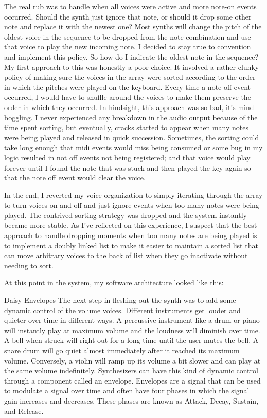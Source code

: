 \documentclass[acmlarge,screen]{acmart}
\begin{document}
The real rub was to handle when all voices were active and more note-on events occurred. Should the synth just ignore that note, or should it drop some other note and replace it with the newest one? Most synths will change the pitch of the oldest voice in the sequence to be dropped from the note combination and use that voice to play the new incoming note. I decided to stay true to convention and implement this policy. So how do I indicate the oldest note in the sequence? My first approach to this was honestly a poor choice. It involved a rather clunky policy of making sure the voices in the array were sorted according to the order in which the pitches were played on the keyboard. Every time a note-off event occurred, I would have to shuffle around the voices to make them preserve the order in which they occurred. In hindsight, this approach was so bad, it's mind-boggling. I never experienced any breakdown in the audio output because of the time spent sorting, but eventually, cracks started to appear when many notes were being played and released in quick succession. Sometimes, the sorting could take long enough that midi events would miss being consumed or some bug in my logic resulted in not off events not being registered; and that voice would play forever until I found the note that was stuck and then played the key again so that the note off event would clear the voice.

In the end, I reverted my voice organization to simply iterating through the array to turn voices on and off and just ignore events when too many notes were being played. The contrived sorting strategy was dropped and the system instantly became more stable. As I've reflected on this experience, I suspect that the best approach to handle dropping moments when too many notes are being played is to implement a doubly linked list to make it easier to maintain a sorted list that can move arbitrary voices to the back of list when they go inactivate without needing to sort.

At this point in the system, my software architecture looked like this:

Daisy
Envelopes
The next step in fleshing out the synth was to add some dynamic control of the volume voices. Different instruments get louder and quieter over time in different ways. A percussive instrument like a drum or piano will instantly play at maximum volume and the loudness will diminish over time. A bell when struck will right out for a long time until the user mutes the bell. A snare drum will go quiet almost immediately after it reached its maximum volume. Conversely, a violin will ramp up its volume a bit slower and can play at the same volume indefinitely. Synthesizers can have this kind of dynamic control through a component called an envelope. Envelopes are a signal that can be used to modulate a signal over time and often have four phases in which the signal gain increases and decreases. These phases are known as Attack, Decay, Sustain, and Release.
\end{document}
